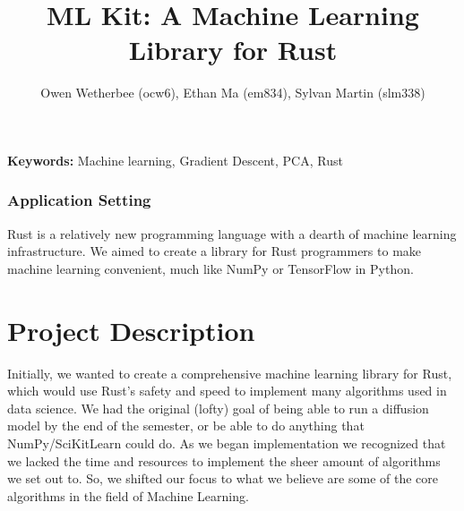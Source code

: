 \documentclass[12pt, letterpaper]{article}
\title{ML Kit: A Machine Learning Library for Rust}
\author{Owen Wetherbee (ocw6), Ethan Ma (em834), Sylvan Martin (slm338)}
\date{}
\theoremstyle{definition}
\theoremstyle{remark}
\begin{document}
\captionsetup{labelformat=empty,labelsep=none}

\maketitle

\begin{center}
    \textbf{Keywords:} Machine learning, Gradient Descent, PCA, Rust
\end{center}

\subsubsection*{Application Setting}

Rust is a relatively new programming language with a dearth of machine learning infrastructure. We aimed to 
create a library for Rust programmers to make machine learning convenient, much like NumPy or TensorFlow in Python.

\section{Project Description}

Initially, we wanted to create a comprehensive machine learning library for Rust, which would use Rust's safety
and speed to implement many algorithms used in data science. We had the original (lofty) goal of being able to 
run a diffusion model by the end of the semester, or be able to do anything that NumPy/SciKitLearn could do. As 
we began implementation we recognized that we lacked the time and resources to implement the sheer amount of algorithms 
we set out to. So, we shifted our focus to what we believe are some of the core algorithms in the field of 
Machine Learning.
\end{document}
